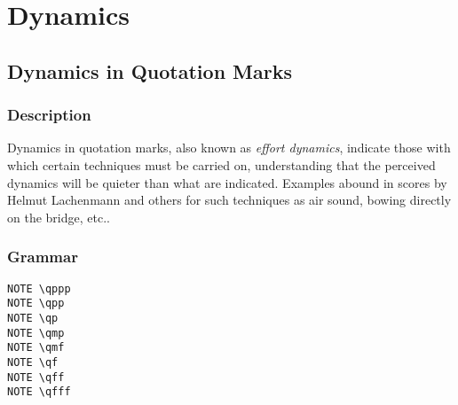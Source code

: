 
\chapter {Dynamics}

\section {Dynamics in Quotation Marks}
\hfill
{}
\hfill

\subsection{Description}
Dynamics in quotation marks, also known as \textit{effort dynamics}, indicate those with which certain techniques must be carried on, understanding that the perceived dynamics will be quieter than what are indicated. Examples abound in scores by Helmut Lachenmann and others for such techniques as air sound, bowing directly on the bridge, etc..

\subsection{Grammar}
\begin{verbatim}
NOTE \qppp
NOTE \qpp
NOTE \qp
NOTE \qmp
NOTE \qmf
NOTE \qf
NOTE \qff
NOTE \qfff
\end{verbatim}
